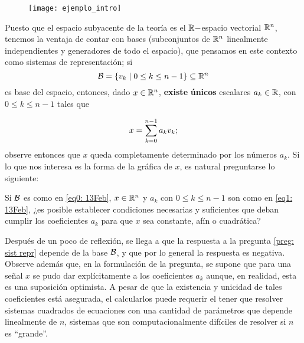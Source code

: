 \begin{figure}[H]
	\texttt{[image: ejemplo\_intro]} 
 \end{figure}

Puesto que el espacio subyacente de 
la teoría es el $\mathbb{R}-$espacio vectorial 
$\mathbb{R}^{n}$, tenemos la ventaja de contar con
bases (subconjuntos de $\mathbb{R}^{n}$ linealmente
independientes y generadores de todo el espacio),
que pensamos en este contexto como sistemas
de representación; si 
\begin{equation}
\label{eq0: 13Feb}
\mathcal{B}=\{v_{k}
 \hspace{0.1cm} |
\hspace{0.1cm} 0 \leq k \leq n-1 \} 
\subseteq \mathbb{R}^{n}
\end{equation}
es base del espacio, entonces, dado $x \in \mathbb{R}^{n}$, 
\textbf{existe} \textbf{únicos} escalares
$a_{k} \in \mathbb{R}$, con $0 \leq k \leq n-1$
tales que

\begin{equation}
\label{eq1: 13Feb}
x = \sum\limits_{k=0}^{n-1}a_{k}v_{k};
\end{equation}
observe entonces que $x$ 
queda completamente determinado por los
números $a_{k}$. Si lo que nos interesa es
la forma de la gráfica de $x$, es natural preguntarse lo siguiente:

\begin{preg}
\label{preg: sist repr}
Si $\mathcal{B}$ es como en \eqref{eq0: 13Feb}, $x \in \mathbb{R}^{n}$
y $a_{k}$ con $0 \leq k \leq n-1$ son como en 
\eqref{eq1: 13Feb}, ¿es posible establecer condiciones
necesarias y suficientes que deban cumplir los coeficientes
$a_{k}$ para que $x$ sea constante, afín o cuadrática?
\end{preg}

Después de un poco de reflexión, se llega a que la respuesta 
a la pregunta \ref{preg: sist repr} depende de la base
$\mathcal{B}$, y que por lo general la respuesta es negativa.
Observe además que, en la formulación de la pregunta,
se supone que para una señal $x$ se pudo dar
explícitamente a los coeficientes $a_{k}$ aunque,
en realidad,  esta es una suposición optimista.
A pesar de que la existencia y unicidad de tales
coeficientes está asegurada, el calcularlos
puede requerir el tener que resolver sistemas cuadrados
de ecuaciones con una cantidad de parámetros que
depende linealmente de $n$, sistemas que son computacionalmente
difíciles de resolver si $n$ es ``grande''.


